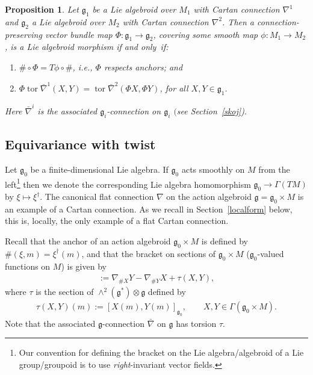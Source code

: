 \documentclass[11pt]{article}
\DeclareMathOperator{\torsion}{tor}
\numberwithin{equation}{section}
\newtheorem{PropositionBlaom}[TheoremBlaom]{Proposition}
 { \theoremstyle{definition}
\newtheorem{CounterexampleBlaom}[TheoremBlaom]{Counterexample}
\newtheorem{RemarkBlaom}[TheoremBlaom]{Remark} }
\begin{document}
\begin{PropositionBlaom}\label{Proposition2.1}
  Let ${\mathfrak g}_1$ be a Lie algebroid over $M_1$ with Cartan
  connection $\nabla^1$ and ${\mathfrak g}_2$ a Lie algebroid over
  $M_2$ with Cartan connection $\nabla^2$. Then a
  connection-preserving vector bundle map $\Phi \colon {\mathfrak g}_1
  \rightarrow {\mathfrak g}_2 $, covering some smooth map $\phi \colon
  M_1 \rightarrow M_2$, is a Lie algebroid morphism if and only~if:
  \begin{enumerate}\itemsep=0pt
  \item[$(1)$] $\# \circ \Phi =T\phi \circ \# $, i.e., $\Phi$ respects
    anchors; and
  \item[$(2)$] $\Phi \torsion \bar \nabla^1 (X,Y)=\torsion \bar\nabla^2(\Phi
    X, \Phi Y) $, for all $X,Y\in{\mathfrak g}_1$.
  \end{enumerate}
  Here $\bar \nabla ^i$ is the associated ${\mathfrak g}_i$-connection
  on ${\mathfrak g}_i$ $($see Section~{\rm \ref{skoj})}.
\end{PropositionBlaom}

\subsection{Equivariance with twist}\label{morph2}

Let ${\mathfrak g}_0$ be a f\/inite-dimensional Lie algebra. If
${\mathfrak g}_0$ acts smoothly on $M$ from the left\footnote{Our
  convention for def\/ining the bracket on the Lie algebra/algebroid of
  a Lie group/groupoid is to use {\em right}-invariant vector f\/ields.}
then we denote the corresponding Lie algebra homomorphism ${\mathfrak
  g}_0 \rightarrow \Gamma(TM)$ by $\xi \mapsto \xi^\dagger$. The
canonical f\/lat connection $\nabla$ on the action algebroid ${\mathfrak
  g}={\mathfrak g}_0 \times M$ is an example of a Cartan
connection. As we recall in Section~\ref{localform} below, this is, locally, the
only example of a f\/lat Cartan connection.

Recall that the anchor of an action algebroid ${\mathfrak g}_0 \times
M$ is def\/ined by $\#(\xi,m)=\xi^\dagger(m)$, and that the bracket on
sections of ${\mathfrak g}_0 \times M$ (${\mathfrak g}_0$-valued
functions on $M$) is given by
\begin{gather}
  [ X, Y]:=\nabla_{\#X}Y-\nabla_{\#Y}X+\tau (X,Y),\label{qwq}
\end{gather}
where $\tau$ is the section of $\wedge^2({\mathfrak g}^*)\otimes
{\mathfrak g} $ def\/ined by
\begin{gather*}
        \tau (X, Y)(m):=[X(m), Y(m)]_{{\mathfrak g}_0},\qquad
        X,Y\in\Gamma(\mathfrak g_0\times M).
\end{gather*}
Note that the associated ${\mathfrak g}$-connection $\bar\nabla$ on
${\mathfrak g}$ has torsion $\tau$.
\end{document}
